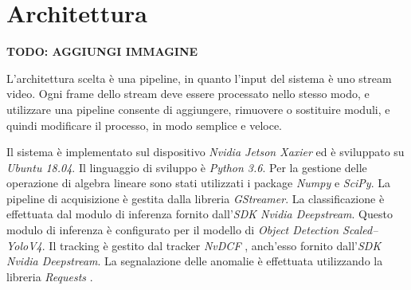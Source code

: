 \chapter{Architettura}
\label{sec:architettura}



\textbf{TODO: AGGIUNGI IMMAGINE}

L'architettura scelta è una pipeline, in quanto l'input del sistema è uno stream video.
Ogni frame dello stream deve essere processato nello stesso modo, e utilizzare una pipeline consente di aggiungere, rimuovere o sostituire moduli, e quindi modificare il processo, in modo semplice e veloce.

Il sistema è implementato sul dispositivo \emph{Nvidia Jetson Xaxier}\cite{arch:jetson} ed è sviluppato su \emph{Ubuntu 18.04}\cite{arch:ubuntu}.
Il linguaggio di sviluppo è \emph{Python 3.6}\cite{arch:python}.
Per la gestione delle operazione di algebra lineare sono stati utilizzati i package \emph{Numpy}\cite{arch:numpy} e \emph{SciPy}\cite{arch:scipy}.
La pipeline di acquisizione è gestita dalla libreria \emph{GStreamer}\cite{arch:gstreamer}.
La classificazione è effettuata dal modulo di inferenza fornito dall'\emph{SDK Nvidia Deepstream}\cite{arch:deepstream}.
Questo modulo di inferenza è configurato per il modello di \emph{Object Detection Scaled--YoloV4}\cite{yolocsp}.
Il tracking è gestito dal tracker \emph{NvDCF} \cite{nvdcf}, anch'esso fornito dall'\emph{SDK Nvidia Deepstream}.
La segnalazione delle anomalie è effettuata utilizzando la libreria \emph{Requests} \cite{arch:requests}.
